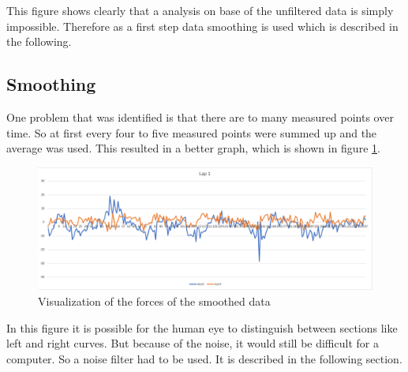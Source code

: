 This figure shows clearly that a analysis on base of the unfiltered data is simply impossible. Therefore as a first step data smoothing is used which is described in the following.

\subsection{Smoothing}
One problem that was identified is that there are to many measured points over time. So at first every four to five measured points were summed up and the average was used. This resulted in a better graph, which is shown in figure \ref{fig:smoFor}.

\begin{figure}[H]
	\centering
	\includegraphics[scale= 0.45]{Pictures/smoothedForces.png}
	\caption{Visualization of the forces of the smoothed data}
	\label{fig:smoFor}
\end{figure}

In this figure it is possible for the human eye to distinguish between sections like left and right curves. But because of the noise, it would still be difficult for a computer. So a noise filter had to be used. It is described in the following section.


